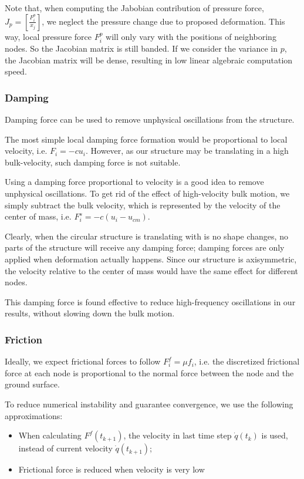 \documentclass[letterpaper,9pt,twocolumn]{extarticle}
\begin{document}
			Note that, when computing the Jabobian contribution of pressure force, $J_p = \left[\frac{F_i^p}{x_j}\right]$, we neglect the pressure change due to proposed deformation. This way, local pressure force $F_i^p$ will only vary with the positions of neighboring nodes. So the Jacobian matrix is still banded. If we consider the variance in $p$, the Jacobian matrix will be dense, resulting in low linear algebraic computation speed. 
		\subsubsection{Damping}
			Damping force can be used to remove unphysical oscillations from the structure.
		
			The most simple local damping force formation would be proportional to local velocity, i.e. $F_i = -cu_i$. However, as our structure may be translating in a high bulk-velocity, such damping force is not suitable.
			
			Using a damping force proportional to velocity is a good idea to remove unphysical oscillations. To get rid of the effect of high-velocity bulk motion, we simply subtract the bulk velocity, which is represented by the velocity of the center of mass, i.e. $F_i^s = -c(u_{i} - u_{cm})$.
			
			Clearly, when the circular structure is translating with is no shape changes, no parts of the structure will receive any damping force; damping forces are only applied when deformation actually happens. Since our structure is axisymmetric, the velocity relative to the center of mass would have the same effect for different nodes. 
			
			This damping force is found effective to reduce high-frequency oscillations in our results, without slowing down the bulk motion.
		\subsubsection{Friction}
			Ideally, we expect frictional forces to follow $F_i^f = \mu f_i$, i.e. the discretized frictional force at each node is proportional to the normal force between the node and the ground surface.
			
			To reduce numerical instability and guarantee convergence, we use the following approximations:
			\begin{itemize}
				\item When calculating $F^f(t_{k+1})$, the velocity in last time step $\dot q(t_k)$ is used, instead of current velocity $\dot q(t_{k+1})$;
				\item Frictional force is reduced when velocity is very low
			\end{itemize}
\end{document}
